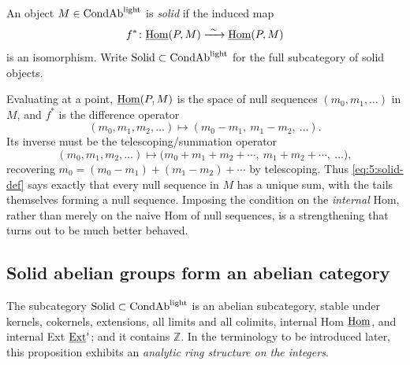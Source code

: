 \begin{definition}
\label{def:5:solid}
An object $M\in\mathrm{CondAb}^{\mathrm{light}}$ is \emph{solid} if the induced map
\begin{equation}
\label{eq:5:solid-def}
f^{\ast}\colon\underline{\operatorname{Hom}}(P,M)\xrightarrow{\ \sim\ }\underline{\operatorname{Hom}}(P,M)
\end{equation}
is an isomorphism. Write $\mathrm{Solid}\subset\mathrm{CondAb}^{\mathrm{light}}$ for the full subcategory of solid
objects.
\end{definition}

\begin{remark}
\label{rmk:5:summation-interpretation}
Evaluating at a point, $\underline{\operatorname{Hom}}(P,M)$ is the space of null sequences
$(m_0,m_1,\dots)$ in $M$, and $f^\ast$ is the difference operator
\begin{equation*}
(m_0,m_1,m_2,\dots)\longmapsto(m_0-m_1,\ m_1-m_2,\ \dots).
\end{equation*}
Its inverse must be the telescoping/summation operator
\begin{equation*}
(m_0,m_1,m_2,\dots)\longmapsto
\bigl(m_0+m_1+m_2+\cdots,\ m_1+m_2+\cdots,\ \dots\bigr),
\end{equation*}
recovering $m_0=(m_0-m_1)+(m_1-m_2)+\cdots$ by telescoping. Thus \eqref{eq:5:solid-def}
says exactly that every null sequence in $M$ has a unique sum, with the tails
themselves forming a null sequence. Imposing the condition on the \emph{internal}
Hom, rather than merely on the naive Hom of null sequences, is a strengthening
that turns out to be much better behaved.
\end{remark}

\subsection{Solid abelian groups form an abelian category}

\begin{proposition}
\label{prop:5:solid-abelian}
The subcategory $\mathrm{Solid}\subset\mathrm{CondAb}^{\mathrm{light}}$ is an abelian subcategory, stable under
kernels, cokernels, extensions, all limits and all colimits, internal Hom
$\underline{\operatorname{Hom}}$, and internal Ext $\underline{\operatorname{Ext}}^{i}$; and it contains $\mathbb{Z}$. In the
terminology to be introduced later, this proposition exhibits an \emph{analytic
ring structure on the integers}.
\end{proposition}

